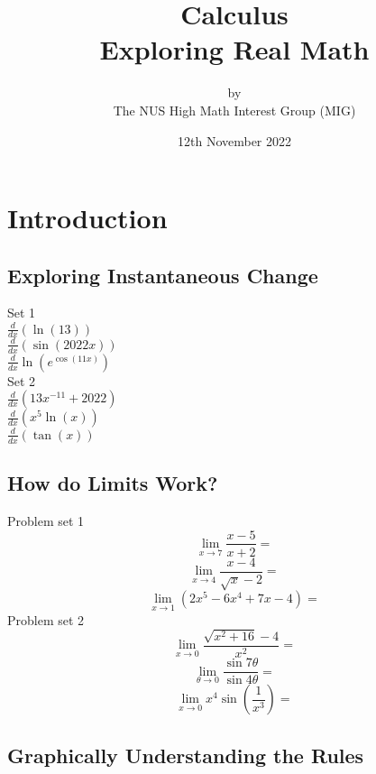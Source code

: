 \documentclass[a4paper,12pt,oneside]{exam}
\title{%
  \Huge Calculus \\
  \LARGE  Exploring \textbf{Real} Math
  }
\author{by \\
\Large The NUS High Math Interest Group (MIG) \\
}
\date{\Large 12th November 2022}
\begin{document}
\maketitle

\tableofcontents

\newpage

\section{Introduction}

\subsection{Exploring Instantaneous Change}

\begin{questions}
\question Set 1
\smallskip\\
$\displaystyle\frac{d}{dx}\left(\ln(13)\right)$
\smallskip\\
$\displaystyle\frac{d}{dx}\left(\sin(2022x)\right)$
\smallskip\\
$\displaystyle\frac{d}{dx}\ln(e^{\cos(11x)})$\\

\question Set 2
\smallskip\\
$\displaystyle\frac{d}{dx}\left(13x^{-11}+2022\right)$
\smallskip\\
$\displaystyle\frac{d}{dx}\left(x^5\ln(x)\right)$
\smallskip\\
$\displaystyle\frac{d}{dx}\left(\tan(x)\right)$\\
\end{questions}

\subsection{How do Limits Work?}

\begin{questions}
\question Problem set 1
\[ \lim_{x\to 7} \frac{x-5}{x+2} =\]
\[ \lim_{x\to 4} \frac{x-4}{\sqrt{x} - 2} =\]
\[ \lim_{x\to 1} (2x^5 -6x^4 + 7x-4) =  \]
\question Problem set 2
\[ \lim_{x\to 0} \frac{\sqrt{x^2+16} - 4}{x^2} =\]
\[ \lim_{\theta\to 0} \frac{\sin 7\theta}{\sin 4 \theta}  =\]
\[ \lim_{x\to 0} x^4 \sin(\frac{1}{x^3})  =\]
\end{questions}

\subsection{Graphically Understanding the Rules}
\end{document}
